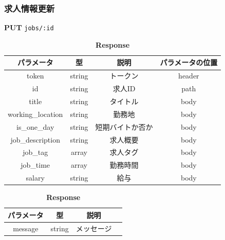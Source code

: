 \subsubsection*{求人情報更新}
\textbf{PUT} \texttt{jobs/:id}
\begin{table}[H]
  \begin{minipage}
    {0.5\hsize} \centering \captionsetup{labelformat=empty,labelsep=none} \caption{\textbf{Request}}
    \small
    \begin{tabular}{|c|c|c|c|} \hline
      パラメータ             & 型      & 説明       & パラメータの位置 \\ \hline \hline
      token             & string & トークン     & header   \\ \hline
      id                & string & 求人ID     & path     \\ \hline
      title             & string & タイトル     & body     \\ \hline
      working\_location & string & 勤務地      & body     \\ \hline
      is\_one\_day      & string & 短期バイトか否か & body     \\ \hline
      job\_description  & string & 求人概要     & body     \\ \hline
      job\_tag          & array  & 求人タグ     & body     \\ \hline
      job\_time         & array  & 勤務時間     & body     \\ \hline
      salary            & string & 給与       & body     \\ \hline
    \end{tabular}
  \end{minipage}
  \begin{minipage}
    {0.5\hsize} \centering \captionsetup{labelformat=empty,labelsep=none} \caption{\textbf{Response}}
    \begin{tabular}{|c|c|c|c|} \hline
      パラメータ   & 型      & 説明    \\ \hline \hline
      message & string & メッセージ \\ \hline
    \end{tabular}
  \end{minipage}
\end{table}

